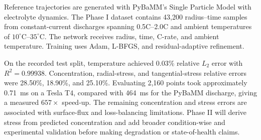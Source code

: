 \documentclass[14pt,a4paper,oneside]{extreport}
\begin{document}
Reference trajectories are generated with PyBaMM's Single Particle Model with electrolyte dynamics. The Phase I dataset contains 43,200 radius--time samples from constant-current discharges spanning 0.5C--2.0C and ambient temperatures of $10^{\circ}$C--$35^{\circ}$C. The network receives radius, time, C-rate, and ambient temperature. Training uses Adam, L-BFGS, and residual-adaptive refinement.

On the recorded test split, temperature achieved 0.03\% relative $L_2$ error with $R^2=0.99938$. Concentration, radial-stress, and tangential-stress relative errors were 28.50\%, 18.90\%, and 25.10\%. Evaluating 2,160 points took approximately 0.71~ms on a Tesla T4, compared with 464~ms for the PyBaMM discharge, giving a measured $657\times$ speed-up. The remaining concentration and stress errors are associated with surface-flux and loss-balancing limitations. Phase II will derive stress from predicted concentration and add broader condition-wise and experimental validation before making degradation or state-of-health claims.

\clearpage
\end{document}
